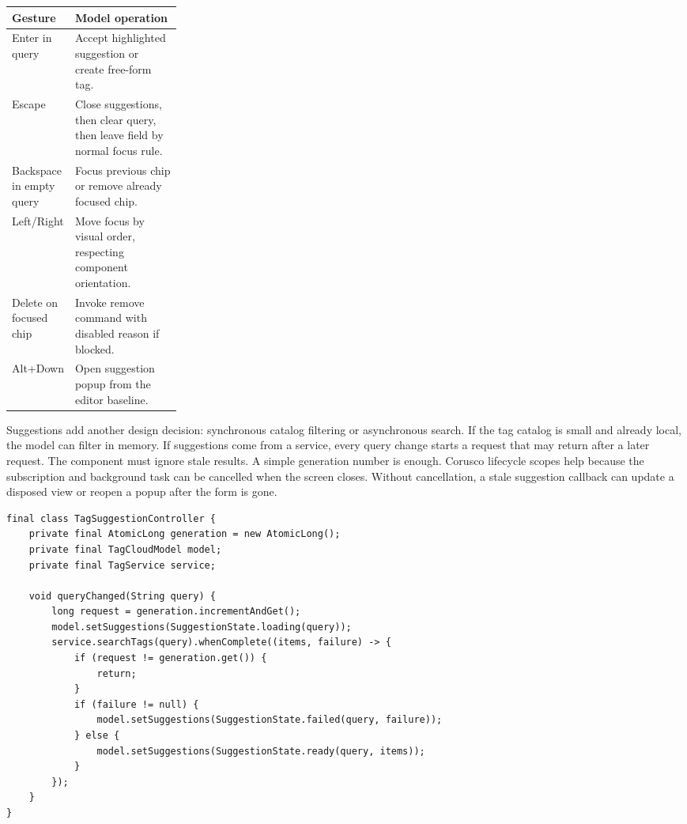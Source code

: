 \begin{tabularx}{0.96\linewidth}{@{}p{0.25\linewidth}X@{}}
\toprule
Gesture & Model operation\\
\midrule
Enter in query & Accept highlighted suggestion or create free-form tag.\\
Escape & Close suggestions, then clear query, then leave field by normal focus rule.\\
Backspace in empty query & Focus previous chip or remove already focused chip.\\
Left/Right & Move focus by visual order, respecting component orientation.\\
Delete on focused chip & Invoke remove command with disabled reason if blocked.\\
Alt+Down & Open suggestion popup from the editor baseline.\\
\bottomrule
\end{tabularx}

Suggestions add another design decision: synchronous catalog filtering or
asynchronous search. If the tag catalog is small and already local, the model can
filter in memory. If suggestions come from a service, every query change starts
a request that may return after a later request. The component must ignore stale
results. A simple generation number is enough. Corusco lifecycle scopes help
because the subscription and background task can be cancelled when the screen
closes. Without cancellation, a stale suggestion callback can update a disposed
view or reopen a popup after the form is gone.

\begin{lstlisting}[caption={Suggestion loading uses a generation token to ignore stale replies.}]
final class TagSuggestionController {
    private final AtomicLong generation = new AtomicLong();
    private final TagCloudModel model;
    private final TagService service;

    void queryChanged(String query) {
        long request = generation.incrementAndGet();
        model.setSuggestions(SuggestionState.loading(query));
        service.searchTags(query).whenComplete((items, failure) -> {
            if (request != generation.get()) {
                return;
            }
            if (failure != null) {
                model.setSuggestions(SuggestionState.failed(query, failure));
            } else {
                model.setSuggestions(SuggestionState.ready(query, items));
            }
        });
    }
}
\end{lstlisting}

